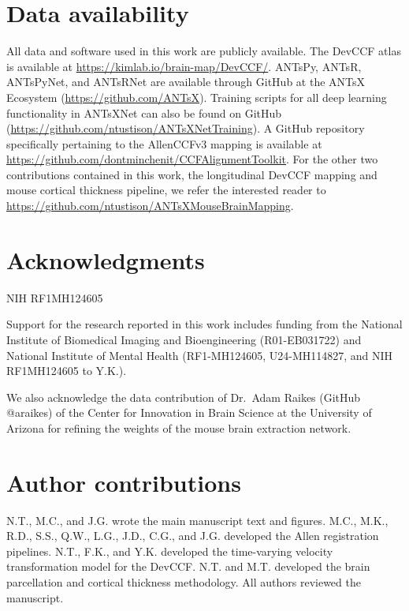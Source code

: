 \documentclass[
  12pt,
]{article}
\begin{document}
\clearpage

\section*{Data availability}\label{data-availability}

All data and software used in this work are publicly available. The
DevCCF atlas is available at \url{https://kimlab.io/brain-map/DevCCF/}.
ANTsPy, ANTsR, ANTsPyNet, and ANTsRNet are available through GitHub at
the ANTsX Ecosystem (\url{https://github.com/ANTsX}). Training scripts
for all deep learning functionality in ANTsXNet can also be found on
GitHub (\url{https://github.com/ntustison/ANTsXNetTraining}). A GitHub
repository specifically pertaining to the AllenCCFv3 mapping is
available at \url{https://github.com/dontminchenit/CCFAlignmentToolkit}.
For the other two contributions contained in this work, the longitudinal
DevCCF mapping and mouse cortical thickness pipeline, we refer the
interested reader to
\url{https://github.com/ntustison/ANTsXMouseBrainMapping}.

\clearpage

\section*{Acknowledgments}\label{acknowledgments}

NIH RF1MH124605

Support for the research reported in this work includes funding from the
National Institute of Biomedical Imaging and Bioengineering
(R01-EB031722) and National Institute of Mental Health (RF1-MH124605,
U24-MH114827, and NIH RF1MH124605 to Y.K.).

We also acknowledge the data contribution of Dr.~Adam Raikes (GitHub
@araikes) of the Center for Innovation in Brain Science at the
University of Arizona for refining the weights of the mouse brain
extraction network.

\clearpage

\section*{Author contributions}\label{author-contributions}

N.T., M.C., and J.G. wrote the main manuscript text and figures. M.C.,
M.K., R.D., S.S., Q.W., L.G., J.D., C.G., and J.G. developed the Allen
registration pipelines. N.T., F.K., and Y.K. developed the time-varying
velocity transformation model for the DevCCF. N.T. and M.T. developed
the brain parcellation and cortical thickness methodology. All authors
reviewed the manuscript. \clearpage
\end{document}
